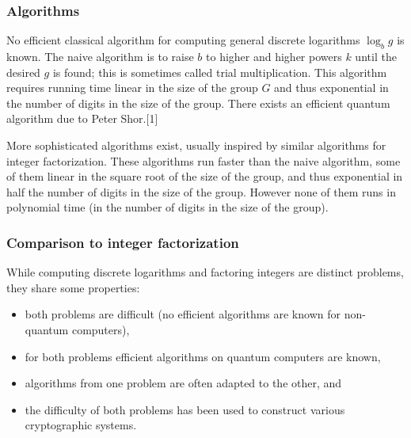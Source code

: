 \documentclass[a4paper, 11pt]{article}
\begin{document}
\subsubsection{Algorithms}
No efficient classical algorithm for computing general discrete logarithms $\log _b g$ is known. The naive algorithm is to raise $b$ to higher and higher powers $k$ until the desired $g$ is found; this is sometimes called trial multiplication. This algorithm requires running time linear in the size of the group $G$ and thus exponential in the number of digits in the size of the group. There exists an efficient quantum algorithm due to Peter Shor.[1]

More sophisticated algorithms exist, usually inspired by similar algorithms for integer factorization. These algorithms run faster than the naive algorithm, some of them linear in the square root of the size of the group, and thus exponential in half the number of digits in the size of the group. However none of them runs in polynomial time (in the number of digits in the size of the group).


\subsubsection{Comparison to integer factorization}
While computing discrete logarithms and factoring integers are distinct problems, they share some properties:

\begin{itemize}
	\setlength{\itemsep}{-2pt}
	\item both problems are difficult (no efficient algorithms are known for non-quantum computers),
	\item for both problems efficient algorithms on quantum computers are known,
	\item algorithms from one problem are often adapted to the other, and
	\item the difficulty of both problems has been used to construct various cryptographic systems.
\end{itemize}
\end{document}
